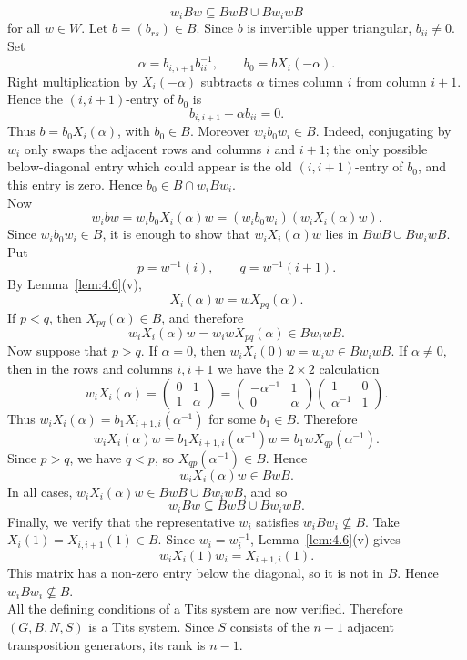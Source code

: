\documentclass[../Odyssey_Project.tex]{subfiles}
\begin{document}
\begin{solution}
\[
    w_iBw\subseteq BwB\cup Bw_iwB
\]
for all $w\in W$. Let $b=(b_{rs})\in B$. Since $b$ is invertible upper triangular, $b_{ii}\neq0$. Set
\[
    \alpha=b_{i,i+1}b_{ii}^{-1},
    \qquad
    b_0=bX_i(-\alpha).
\]
Right multiplication by $X_i(-\alpha)$ subtracts $\alpha$ times column $i$ from column $i+1$. Hence the $(i,i+1)$-entry of $b_0$ is
\[
    b_{i,i+1}-\alpha b_{ii}=0.
\]
Thus $b=b_0X_i(\alpha)$, with $b_0\in B$. Moreover $w_ib_0w_i\in B$. Indeed, conjugating by $w_i$ only swaps the adjacent rows and columns $i$ and $i+1$; the only possible below-diagonal entry which could appear is the old $(i,i+1)$-entry of $b_0$, and this entry is zero. Hence $b_0\in B\cap w_iBw_i$.\\
Now
\[
    w_ibw
    =
    w_ib_0X_i(\alpha)w
    =
    (w_ib_0w_i)(w_iX_i(\alpha)w).
\]
Since $w_ib_0w_i\in B$, it is enough to show that $w_iX_i(\alpha)w$ lies in $BwB\cup Bw_iwB$. Put
\[
    p=w^{-1}(i),
    \qquad
    q=w^{-1}(i+1).
\]
By Lemma~\ref{lem:4.6}(v),
\[
    X_i(\alpha)w=wX_{pq}(\alpha).
\]
If $p<q$, then $X_{pq}(\alpha)\in B$, and therefore
\[
    w_iX_i(\alpha)w
    =
    w_iwX_{pq}(\alpha)
    \in Bw_iwB.
\]
Now suppose that $p>q$. If $\alpha=0$, then $w_iX_i(0)w=w_iw\in Bw_iwB$. If $\alpha\neq0$, then in the rows and columns $i,i+1$ we have the $2\times2$ calculation
\[
    w_iX_i(\alpha)
    =
    \begin{pmatrix}
        0&1\\
        1&\alpha
    \end{pmatrix}
    =
    \begin{pmatrix}
        -\alpha^{-1}&1\\
        0&\alpha
    \end{pmatrix}
    \begin{pmatrix}
        1&0\\
        \alpha^{-1}&1
    \end{pmatrix}.
\]
Thus $w_iX_i(\alpha)=b_1X_{i+1,i}(\alpha^{-1})$ for some $b_1\in B$. Therefore
\[
    w_iX_i(\alpha)w
    =
    b_1X_{i+1,i}(\alpha^{-1})w
    =
    b_1wX_{q p}(\alpha^{-1}).
\]
Since $p>q$, we have $q<p$, so $X_{q p}(\alpha^{-1})\in B$. Hence
\[
    w_iX_i(\alpha)w\in BwB.
\]
In all cases, $w_iX_i(\alpha)w\in BwB\cup Bw_iwB$, and so
\[
    w_iBw\subseteq BwB\cup Bw_iwB.
\]
Finally, we verify that the representative $w_i$ satisfies $w_iBw_i\nsubseteq B$. Take $X_i(1)=X_{i,i+1}(1)\in B$. Since $w_i=w_i^{-1}$, Lemma~\ref{lem:4.6}(v) gives
\[
    w_iX_i(1)w_i=X_{i+1,i}(1).
\]
This matrix has a non-zero entry below the diagonal, so it is not in $B$. Hence $w_iBw_i\nsubseteq B$.\\
All the defining conditions of a Tits system are now verified. Therefore $(G,B,N,S)$ is a Tits system. Since $S$ consists of the $n-1$ adjacent transposition generators, its rank is $n-1$.
\end{solution}
\end{document}
